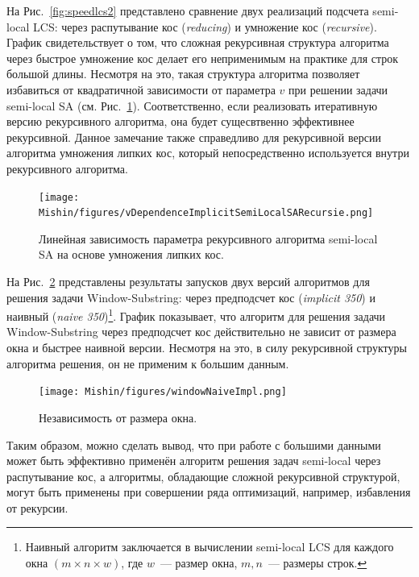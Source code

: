 На Рис.~\ref{fig:speedlcs2} представлено сравнение двух реализаций подсчета {semi-local LCS}: через распутывание кос (\emph{reducing}) и умножение кос (\emph{recursive}).
График свидетельствует о том, что сложная рекурсивная структура алгоритма через быстрое умножение кос делает его неприменимым на практике для строк большой длины.
Несмотря на это, такая структура алгоритма позволяет избавиться от квадратичной зависимости от параметра $v$ при решении задачи semi-local SA (см. Рис.~\ref{fig:vParam}).
Соответственно, если реализовать итеративную версию рекурсивного алгоритма, она будет сущесвтвенно эффективнее рекурсивной.
Данное замечание также справедливо для рекурсивной версии алгоритма умножения липких кос, который непосредственно используется внутри рекурсивного алгоритма.

\begin{figure}[t!]
\centering
    \texttt{[image: Mishin/figures/vDependenceImplicitSemiLocalSARecursie.png]}
    \caption{Линейная зависимость параметра рекурсивного алгоритма {semi-local SA} на основе умножения липких кос.}\label{fig:vParam}
\end{figure}

На Рис.~\ref{fig:speedWindow3} представлены результаты запусков двух версий алгоритмов для решения задачи Window-Substring: через предподсчет кос (\emph{implicit 350}) и наивный (\emph{naive 350})\footnote{Наивный алгоритм заключается в вычислении {semi-local LCS} для каждого окна $(m \times n \times w)$, где $w$~--- размер окна, $m,n$~--- размеры строк.
}.
График  показывает, что алгоритм для решения задачи Window-Substring через предподсчет кос действительно не зависит от размера окна и быстрее наивной версии.
Несмотря на это, в силу рекурсивной структуры алгоритма решения, он не применим к большим данным.

\begin{figure}[t!]
\centering
    \texttt{[image: Mishin/figures/windowNaiveImpl.png]}
    \caption{Независимость от размера окна.}\label{fig:speedWindow3}
\end{figure}

Таким образом, можно сделать вывод, что  при работе с большими данными может быть эффективно применён алгоритм решения задач semi-local через распутывание кос, а алгоритмы, обладающие сложной рекурсивной структурой, могут быть применены при совершении ряда оптимизаций, например, избавления от рекурсии.


